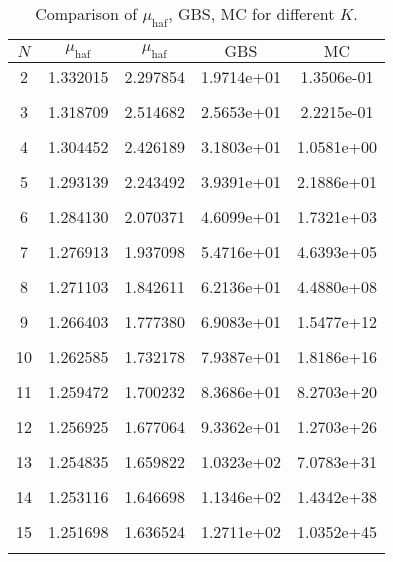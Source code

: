 \begin{table}[h!]
    \centering
    \begin{tabular}{|c|c|c|c|c|}
    \hline
    $N$ & $\mu_{\text{haf}}$ & $\mu_{\text{haf}}$ & $\text{GBS}$ & $\text{MC}$\\ 
    \hline
2&1.332015 &2.297854 &  1.9714e+01 & 1.3506e-01\\\\
3&1.318709 &2.514682 &  2.5653e+01 & 2.2215e-01\\\\
4&1.304452 &2.426189 &  3.1803e+01 & 1.0581e+00\\\\
5&1.293139 &2.243492 &  3.9391e+01 & 2.1886e+01\\\\
6&1.284130 &2.070371 &  4.6099e+01 & 1.7321e+03\\\\
7&1.276913 &1.937098 &  5.4716e+01 & 4.6393e+05\\\\
8&1.271103 &1.842611 &  6.2136e+01 & 4.4880e+08\\\\
9&1.266403 &1.777380 &  6.9083e+01 & 1.5477e+12\\\\
10&1.262585 &1.732178 &  7.9387e+01 & 1.8186e+16\\\\
11&1.259472 &1.700232 &  8.3686e+01 & 8.2703e+20\\\\
12&1.256925 &1.677064 &  9.3362e+01 & 1.2703e+26\\\\
13&1.254835 &1.659822 &  1.0323e+02 & 7.0783e+31\\\\
14&1.253116 &1.646698 &  1.1346e+02 & 1.4342e+38\\\\
15&1.251698 &1.636524 &  1.2711e+02 & 1.0352e+45\\\\
\hline
    \end{tabular}
    \caption{Comparison of $\mu_{\text{haf}}$, GBS, MC for different $K$.}
    \label{tab:comparison}
    \end{table}